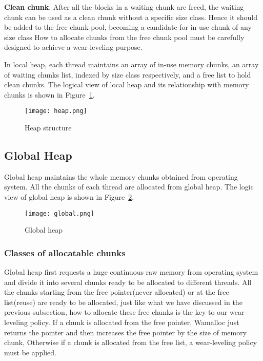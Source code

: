 \documentclass[10pt, conference, compsocconf]{IEEEtran}
\begin{document}
\textbf{Clean chunk}.
After all the blocks in a waiting chunk are freed, 
the waiting chunk can be used as a clean chunk without a specific size class.
Hence it should be added to the free chunk pool, becoming a candidate for in-use chunk of any size class
How to allocate chunks from the free chunk pool must be carefully designed to achieve a wear-leveling purpose.


In local heap,
each thread maintains an array of in-use memory chunks, 
an array of waiting chunks list, indexed by size class respectively, 
and a free list to hold clean chunks.
The logical view of local heap and its relationship with memory chunks is shown in Figure~\ref{fig:heap}.

\begin{figure}[h]
\centering
\texttt{[image: heap.png]}
\caption{Heap structure}
\label{fig:heap}
\end{figure}

\subsection{Global Heap}

Global heap maintains the whole memory chunks obtained from operating system. 
All the chunks of each thread are allocated from global heap. 
The logic view of global heap is shown in Figure~\ref{fig:global}.

\begin{figure}[h]
\centering
\texttt{[image: global.png]}
\caption{Global heap}
\label{fig:global}
\end{figure}

\subsubsection{Classes of allocatable chunks}
Global heap first requests a huge continuous raw memory from operating system
and divide it into several chunks ready to be allocated to different threads.
All the chunks starting from the free pointer(never allocated) or at the free list(reuse) are ready to be allocated, 
just like what we have discussed in the previous subsection,
how to allocate these free chunks is the key to our wear-leveling policy.
If a chunk is allocated from the free pointer, 
Wamalloc just returns the pointer and then increases the free pointer by the size of memory chunk, 
Otherwise if a chunk is allocated from the free list, a wear-leveling policy must be applied.
\end{document}
